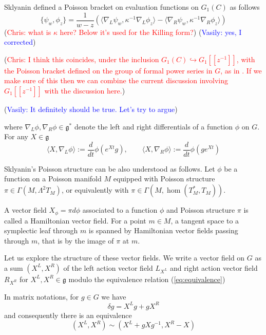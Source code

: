 \documentclass[11pt, oneside, reqno]{amsart}
\theoremstyle{definition} \newtheorem{definition}{Definition}[section]
\theoremstyle{definition} \newtheorem{remark}[definition]{Remark}
\theoremstyle{definition} \newtheorem{remarks}[definition]{Remarks}
\theoremstyle{definition} \newtheorem{question}[definition]{Question}
\theoremstyle{definition} \newtheorem*{note}{Note}
\theoremstyle{definition} \newtheorem{example}[definition]{Example}
\theoremstyle{definition} \newtheorem{examples}[definition]{Examples}
\renewcommand{\gg}{\mathfrak{g}}
\newcommand{\inj}{\hookrightarrow}
\newcommand{\chris}[1]{(\textcolor{red}{Chris: #1})}
\newcommand{\vasily}[1]{(\textcolor{blue}{Vasily: #1})}
\begin{document}
Sklyanin defined a Poisson bracket on evaluation functions on $G_1(C)$ as follows
\begin{equation}
\label{eq:Sklyanin}
  \{ \psi_{w}, \phi_{z} \} = \frac{1}{w - z}(\langle \nabla_{L} \psi_w, \kappa^{-1} \nabla_{L} \phi_{z}
\rangle  - \langle \nabla_{R} \psi_{w},  \kappa^{-1} \nabla_{R} \phi_{z}\rangle)
\end{equation}
\chris{what is $\kappa$ here?  Below it's used for the Killing form?}
\vasily{yes, I corrected}

\chris{I think this coincides, under the inclusion $G_1(C) \inj G_1[[z^{-1}]]$, with the Poisson bracket defined on the group of formal power series in $G$, as in \cite[Theorem 3.10]{Williams}.  If we make sure of this then we can combine the current discussion involving $G_1[[z^{-1}]]$ with the discussion here.}

\vasily{It definitely should be true. Let's try to argue}

where $\nabla_{L}\phi , \nabla_{R}\phi \in \gg^{*} $ denote the left and right differentials
of a function $\phi$ on $G$. For any $X \in \gg$
\begin{equation}
  \langle X, \nabla_{L} \phi \rangle := \frac{d}{dt} \phi(e^{Xt} g),
  \qquad \langle X, \nabla_{R} \phi \rangle := \frac{d}{dt} \phi(g e^{Xt})
\end{equation}

Sklyanin's Poisson structure can be also understood as follows. Let $\phi$ be a function
on a Poisson manifold $M$ equipped with Poisson structure $\pi \in \Gamma(M,\Lambda^2 T_{M})$,
or equivalently with $\pi \in \Gamma(M, \hom (T_{M}^{*}, T_{M}))$. 

A vector field $X_{\phi} = \pi d \phi $ associated to a function $\phi$ and Poisson structure $\pi$ is called a Hamiltonian vector field. For a point $m \in M$, a tangent space to a symplectic
leaf through $m$ is spanned by Hamiltonian vector fields passing through $m$, 
that is by the image of $\pi$ at $m$.

Let us explore the structure of these vector fields. We write a vector field on $G$
as a sum  $(X^L, X^R)$  of the left action vector field $L_{X^L}$ and right action vector field $R_{X^R}$
for $X^L, X^R \in \gg$ modulo the equivalence relation (\ref{eq:equivalence})

In matrix notations, for $g \in G$ we have
\begin{equation}
  \delta g = X^L g + g X^R 
\end{equation}
and consequently there is an equivalence 
\begin{equation}
\label{eq:equivalence0}
  (X^L, X^R) \sim (X^L + g X g^{-1}, X^R -  X)
\end{equation}
\end{document}
